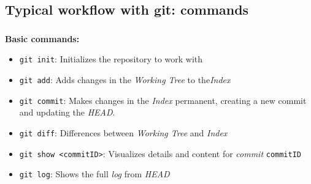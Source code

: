 
\subsection{Typical workflow with git: commands}

\begin{frame}
  \frametitle{\insertsubsection}

  \textbf{Basic commands:}
  \begin{itemize}

  \item \texttt{git init}: Initializes the repository to work with
    \git \vspacing

  \item \texttt{git add}: Adds changes in the \textit{Working Tree} to
    the\textit{Index}
    \vspacing

  \item \texttt{git commit}: Makes changes in the \textit{Index}
    permanent, creating a new commit and updating the \textit{HEAD}.
    \vspacing

  \item \texttt{git diff}: Differences between \textit{Working Tree} and
    \textit{Index}
    \vspacing

  \item \texttt{git show <commitID>}: Visualizes details and content for \textit{commit}
    \texttt{commitID} \vspacing

  \item \texttt{git log}: Shows the full \textit{log} from
    \textit{HEAD} \vspacing
  \end{itemize}
\end{frame}


